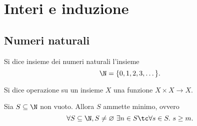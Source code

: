 \chapter{Interi e induzione}

\section{Numeri naturali}

\begin{definition}
    Si dice insieme dei numeri naturali l'insieme \[
        \N = \{0, 1, 2, 3, \dots\}.   
    \]
\end{definition}

\begin{definition}
    Si dice operazione su un insieme $X$ una funzione $X \times X \to X$.
\end{definition}

\begin{principle}
    Sia $S \subseteq \N$ non vuoto. Allora $S$ ammette minimo, ovvero \[
        \forall S \subseteq \N, S \neq \varnothing \,\, \exists n \in S \tc \forall s \in S.\ s \geq m.  
    \]
\end{principle}

